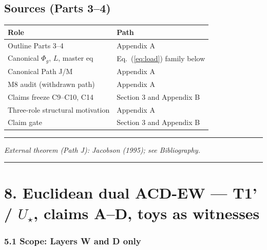 \documentclass[
  11pt,
]{article}
\newcounter{none} %
\begin{document}
\subsection{Sources (Parts 3--4)}\label{sources-parts-34}

{\def\LTcaptype{none} %
\begin{longtable}[]{@{}
  >{\raggedright\arraybackslash}p{}
  >{\raggedright\arraybackslash}p{}@{}}
\toprule\noalign{}
\begin{minipage}[b]{\linewidth}\raggedright
Role
\end{minipage} & \begin{minipage}[b]{\linewidth}\raggedright
Path
\end{minipage} \\
\midrule\noalign{}
\endhead
\bottomrule\noalign{}
\endlastfoot
Outline Parts 3--4 & Appendix A \\
Canonical \(\Phi_g\), \(L\), master eq & Eq.~(\ref{eq:load}) family
below \\
Canonical Path J/M & Appendix A \\
M8 audit (withdrawn path) & Appendix A \\
Claims freeze C9--C10, C14 & Section 3 and Appendix B \\
Three-role structural motivation & Appendix A \\
Claim gate & Section 3 and Appendix B \\
\end{longtable}
}

\begin{center}\rule{0.5\linewidth}{0.5pt}\end{center}

\emph{External theorem (Path J): Jacobson (1995); see Bibliography.}

\begin{center}\rule{0.5\linewidth}{0.5pt}\end{center}

\section{\texorpdfstring{8. Euclidean dual ACD-EW --- T1' / \(U_\star\),
claims A--D, toys as
witnesses}{8. Euclidean dual ACD-EW --- T1' / U\_\textbackslash star, claims A--D, toys as witnesses}}\label{euclidean-dual-acd-ew-t1-u_star-claims-ad-toys-as-witnesses}

\subsubsection{5.1 Scope: Layers W and D
only}\label{scope-layers-w-and-d-only}
\end{document}
